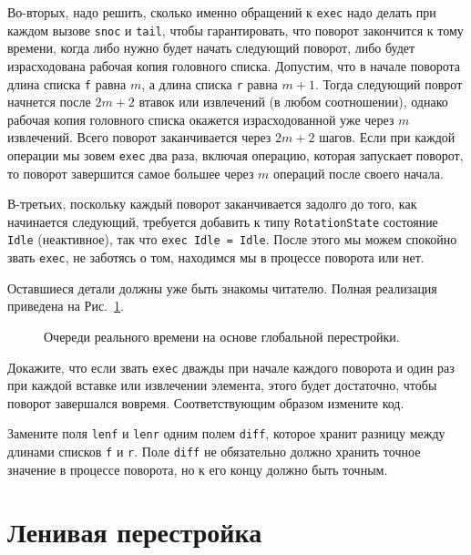 Во-вторых, надо решить, сколько именно обращений к \lstinline!exec!
надо делать при каждом вызове \lstinline!snoc! и \lstinline!tail!,
чтобы гарантировать, что поворот закончится к тому времени, когда либо
нужно будет начать следующий поворот, либо будет израсходована рабочая
копия головного списка.  Допустим, что в начале поворота длина списка
\lstinline!f! равна $m$, а длина списка \lstinline!r! равна
$m+1$. Тогда следующий поврот начнется после $2m+2$ втавок или
извлечений (в любом соотношении), однако рабочая копия головного
списка окажется израсходованной уже через $m$ извлечений. Всего
поворот заканчивается через $2m+2$ шагов. Если при каждой операции мы
зовем \lstinline!exec! два раза, включая операцию, которая запускает
поворот, то поворот завершится самое большее через $m$ операций после
своего начала.

В-третьих, поскольку каждый поворот заканчивается задолго до того, как
начинается следующий, требуется добавить к типу
\lstinline!RotationState! состояние \lstinline!Idle! (неактивное), так
что \lstinline!exec Idle = Idle!. После этого мы можем спокойно звать
\lstinline!exec!, не заботясь о том, находимся мы в процессе поворота
или нет.

Оставшиеся детали должны уже быть знакомы читателю. Полная реализация
приведена на Рис.~\ref{fig:8.1}.

\begin{figure}
  \centering
  
  \caption{Очереди реального времени на основе глобальной перестройки.}
  \label{fig:8.1}
\end{figure}

\begin{exercise}\label{ex:8.1}
  Докажите, что если звать \lstinline!exec! дважды при начале
  каждого поворота и один раз при каждой вставке или извлечении
  элемента, этого будет достаточно, чтобы поворот завершался
  вовремя. Соответствующим образом измените код.
\end{exercise}

\begin{exercise}\label{ex:8.2}
  Замените поля \lstinline!lenf! и \lstinline!lenr! одним полем
  \lstinline!diff!, которое хранит разницу между длинами списков
  \lstinline!f! и \lstinline!r!. Поле \lstinline!diff! не обязательно
  должно хранить точное значение в процессе поворота, но к его концу
  должно быть точным.
\end{exercise}

\section{Ленивая перестройка}
\label{sc:8.3x}

